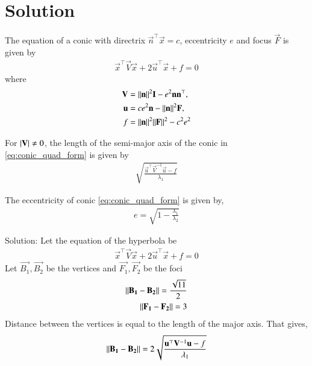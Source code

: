 \documentclass[journal,12pt,twocolumn]{IEEEtran}
\begin{document}
\section{Solution}
\begin{theorem}
The equation of  a conic with directrix $\vec{n}^{\top}\vec{x} = c$, eccentricity $e$ and focus $\vec{F}$ is given by 
\begin{align}
    \label{eq:conic_quad_form}
    \vec{x}^{\top}\vec{V}\vec{x}+2\vec{u}^{\top}\vec{x}+f=0
\end{align}
where     
\begin{align}
    \label{eq:conic_quad_form_v}
    \mathbf{V} &=\lVert\mathbf{n}\rVert^2\mathbf{I}-e^2\mathbf{n}\mathbf{n}^{\top}, \\
    \label{eq:conic_quad_form_u}
    \mathbf{u} &= ce^2\mathbf{n}-\lVert\mathbf{n}\rVert^2\mathbf{F}, \\
    \label{eq:conic_quad_form_f}
    f &= \lVert\mathbf{n}\rVert^2\lVert\mathbf{F}\rVert^2-c^2e^2
\end{align}
\end{theorem}
\begin{theorem}
    For $\vert\mathbf{V}\vert \ne 0$, the length of the semi-major axis of the conic in \eqref{eq:conic_quad_form} is given by 
    \begin{align} 
        \sqrt{\frac{\vec{u}^{\top}\vec{V}^{-1}\vec{u} -f}{\lambda_1}}
        \label{eq:ab}
    \end{align}
\end{theorem}
\begin{theorem}
The eccentricity of conic \eqref{eq:conic_quad_form} is given by,
\begin{align}
    \label{eq:eccentricity} e = \sqrt{1 - \frac{\lambda_1}{\lambda_2}}
\end{align}
\end{theorem}
Solution: Let the equation of the hyperbola be
\begin{align}
     \vec{x}^{\top}\vec{V}\vec{x}+2\vec{u}^{\top}\vec{x}+f=0
\end{align}
Let $\vec{B_1}, \vec{B_2}$ be the vertices and $\vec{F_1}, \vec{F_2}$ be the foci
\begin{align}
    \lVert\mathbf{B_1}-\mathbf{B_2}\rVert = \frac{\sqrt{11}}{2}\\
    \lVert\mathbf{F_1}-\mathbf{F_2}\rVert = 3
\end{align}
Distance between the vertices is equal to the length of the major axis. That gives,
\begin{align}
    \label{eq1} \lVert\mathbf{B_1}-\mathbf{B_2}\rVert = 2\sqrt{\frac{\mathbf{u}^{\top}\mathbf{V}^{-1}\mathbf{u} -f}{\lambda_1}}
\end{align}
\end{document}
